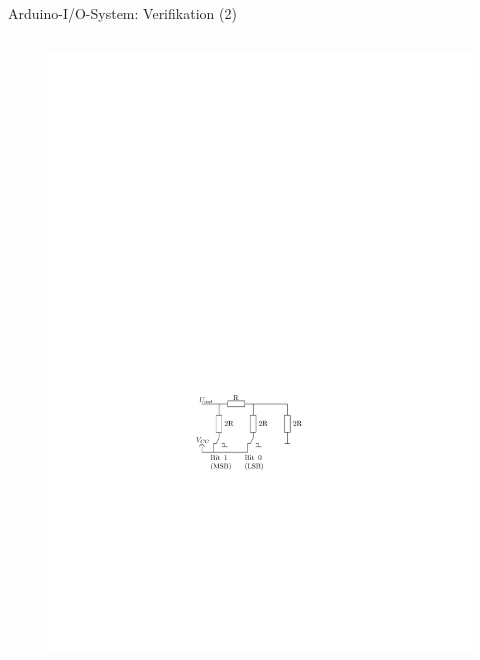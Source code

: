 \documentclass{beamer}
\begin{document}
\begin{frame}{Arduino-I/O-System: Verifikation (2)}
\begin{columns}
\begin{column}{0.4\textwidth}
\begin{figure}[htbp]
				\includegraphics[scale=0.6]{./images/arduinoio-r2r-network.pdf}
			\end{figure}
		\end{column}
	\end{columns}
\end{frame}
\end{document}
